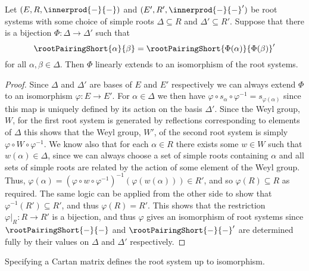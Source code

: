 \documentclass[fleqn]{NotesClass}
\begin{document}
    \begin{thm}{}{}
        Let \((E, R, \innerprod{-}{-})\) and \((E', R', \innerprod{-}{-}')\) be root systems with some choice of simple roots \(\Delta \subseteq R\) and \(\Delta' \subseteq R'\).
        Suppose that there is a bijection \(\Phi \colon \Delta \to \Delta'\) such that
        \begin{equation}
            \rootPairingShort{\alpha}{\beta} = \rootPairingShort{\Phi(\alpha)}{\Phi(\beta)}'
        \end{equation}
        for all \(\alpha, \beta \in \Delta\).
        Then \(\Phi\) linearly extends to an isomorphism of the root systems.
        \begin{proof}
            Since \(\Delta\) and \(\Delta'\) are bases of \(E\) and \(E'\) respectively we can always extend \(\Phi\) to an isomorphism \(\varphi \colon E \to E'\).
            For \(\alpha \in \Delta\) we then have \(\varphi \circ s_\alpha \circ \varphi^{-1} = s_{\varphi(\alpha)}\) since this map is uniquely defined by its action on the basis \(\Delta'\).
            Since the Weyl group, \(W\), for the first root system is generated by reflections corresponding to elements of \(\Delta\) this shows that the Weyl group, \(W'\), of the second root system is simply \(\varphi \circ W \circ \varphi^{-1}\).
            We know also that for each \(\alpha \in R\) there exists some \(w \in W\) such that \(w(\alpha) \in \Delta\), since we can always choose a set of simple roots containing \(\alpha\) and all sets of simple roots are related by the action of some element of the Weyl group.
            Thus, \(\varphi(\alpha) = (\varphi \circ w \circ \varphi^{-1})^{-1}(\varphi(w(\alpha))) \in R'\), and so \(\varphi(R) \subseteq R\) as required.
            The same logic can be applied from the other side to show that \(\varphi^{-1}(R') \subseteq R'\), and thus \(\varphi(R) = R'\).
            This shows that the restriction \(\varphi|_R \colon R \to R'\) is a bijection, and thus \(\varphi\) gives an isomorphism of root systems since \(\rootPairingShort{-}{-}\) and \(\rootPairingShort{-}{-}'\) are determined fully by their values on \(\Delta\) and \(\Delta'\) respectively.
        \end{proof}
    \end{thm}
    
    \begin{crl}{}{}
        Specifying a Cartan matrix defines the root system up to isomorphism.
    \end{crl}
    
\end{document}
